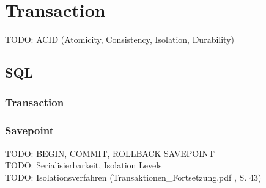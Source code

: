 \section{Transaction}
    TODO: ACID (Atomicity, Consistency, Isolation, Durability) \\
    \subsection{SQL}
        \subsubsection{Transaction}
            
        \subsubsection{Savepoint}
            
    TODO: BEGIN, COMMIT, ROLLBACK SAVEPOINT \\
    TODO: Serialisierbarkeit, Isolation Levels \\
    TODO: Isolationsverfahren (Transaktionen\_Fortsetzung.pdf , S. 43)